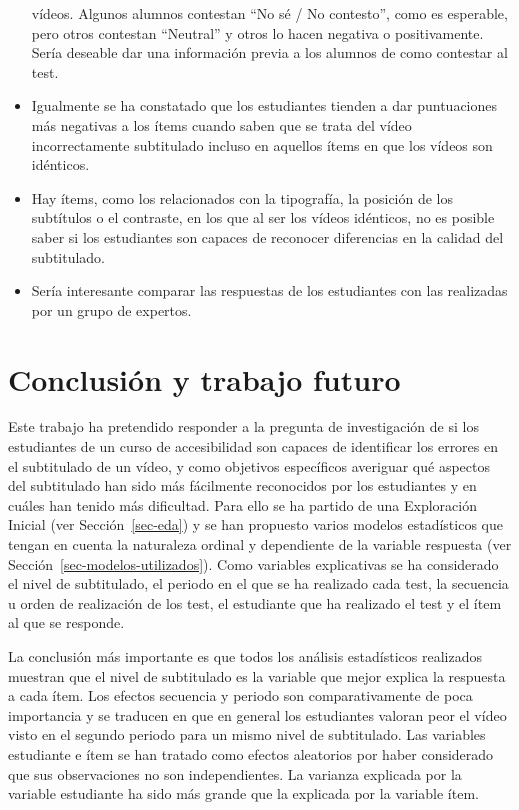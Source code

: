 \documentclass[
  12pt,
  a4paper,
  extrafontsizes,
  onecolumn,
  openright,
  table]{memoir}
\begin{document}
\begin{itemize}
  vídeos. Algunos alumnos contestan \enquote{No sé / No contesto}, como
  es esperable, pero otros contestan \enquote{Neutral} y otros lo hacen
  negativa o positivamente. Sería deseable dar una información previa a
  los alumnos de como contestar al test.
\item
  Igualmente se ha constatado que los estudiantes tienden a dar
  puntuaciones más negativas a los ítems cuando saben que se trata del
  vídeo incorrectamente subtitulado incluso en aquellos ítems en que los
  vídeos son idénticos.
\item
  Hay ítems, como los relacionados con la tipografía, la posición de los
  subtítulos o el contraste, en los que al ser los vídeos idénticos, no
  es posible saber si los estudiantes son capaces de reconocer
  diferencias en la calidad del subtitulado.
\item
  Sería interesante comparar las respuestas de los estudiantes con las
  realizadas por un grupo de expertos.
\end{itemize}


\hypertarget{sec-conclusion}{%
\chapter{Conclusión y trabajo futuro}\label{sec-conclusion}}

Este trabajo ha pretendido responder a la pregunta de investigación de
si los estudiantes de un curso de \gls{accesibilidad} son capaces de
identificar los errores en el subtitulado de un vídeo, y como objetivos
específicos averiguar qué aspectos del subtitulado han sido más
fácilmente reconocidos por los estudiantes y en cuáles han tenido más
dificultad. Para ello se ha partido de una Exploración Inicial (ver
Sección~\ref{sec-eda}) y se han propuesto varios modelos estadísticos
que tengan en cuenta la naturaleza ordinal y dependiente de la variable
respuesta (ver Sección~\ref{sec-modelos-utilizados}). Como variables
explicativas se ha considerado el nivel de subtitulado, el periodo en el
que se ha realizado cada test, la secuencia u orden de realización de
los test, el estudiante que ha realizado el test y el ítem al que se
responde.

La conclusión más importante es que todos los análisis estadísticos
realizados muestran que el nivel de subtitulado es la variable que mejor
explica la respuesta a cada ítem. Los efectos secuencia y periodo son
comparativamente de poca importancia y se traducen en que en general los
estudiantes valoran peor el vídeo visto en el segundo periodo para un
mismo nivel de subtitulado. Las variables estudiante e ítem se han
tratado como efectos aleatorios por haber considerado que sus
observaciones no son independientes. La varianza explicada por la
variable estudiante ha sido más grande que la explicada por la variable
ítem.
\end{document}
